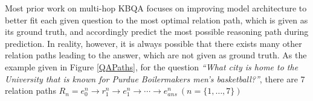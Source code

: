 Most prior work on multi-hop KBQA focuses on improving model architecture to better fit each given question to the most optimal relation path, which is given as its ground truth, and accordingly predict the most possible reasoning path during prediction. In reality, however, it is always possible that there exists many other relation paths leading to the answer, which are not given as ground truth. %
As the example given in Figure \ref{QAPaths}, for the question \textit{``What city is home to the University that is known for Purdue Boilermakers men's basketball?''}, there are 7 relation paths $R_n={e^n_0\rightarrow r^n_1 \rightarrow e^n_1 \rightarrow \cdots \rightarrow e^n_{ans}}\ (n=\lbrace 1, \dots, 7 \rbrace)$%
